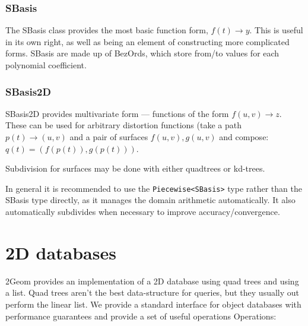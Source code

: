 \documentclass[openany]{book}
\newcommand{\code}[1]{\textsf{#1}}
\begin{document}
\subsection{SBasis}
The \code{SBasis} class provides the most basic function form,
$f(t) \rightarrow y$.  This is useful in its own right, as well as being an
element of constructing more complicated forms.  \code{SBasis} are made
up of \code{BezOrd}s, which store from/to values for each polynomial
coefficient.

\subsection{SBasis2D}
SBasis2D provides multivariate form --- functions of the form
$f(u,v) \rightarrow z$.  These can be used for arbitrary distortion
functions (take a path $p(t) \rightarrow (u,v)$ and a pair of surfaces
$f(u,v),g(u,v)$ and compose: $q(t) = (f(p(t)), g(p(t)))$.

Subdivision for surfaces may be done with either quadtrees or kd-trees.

In general it is recommended to use the \verb|Piecewise<SBasis>| type rather than the SBasis type directly, as it manages the domain arithmetic automatically.  It also automatically subdivides when necessary to improve accuracy/convergence.

\chapter{2D databases}

2Geom provides an implementation of a 2D database using quad trees and
using a list.  Quad trees aren't the best data-structure for queries,
but they usually out perform the linear list.  We provide a
standard interface for object databases with performance guarantees
and provide a set of useful operations Operations:
\end{document}
